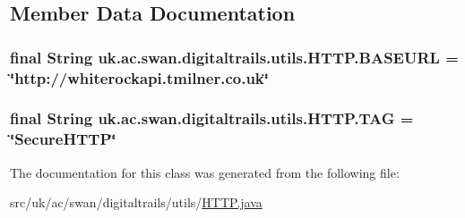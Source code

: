\subsection{Member Data Documentation}
\hypertarget{classuk_1_1ac_1_1swan_1_1digitaltrails_1_1utils_1_1_h_t_t_p_adc7390074ee303b7a69c94c5e1fb0356}{
\subsubsection[{B\+A\+S\+E\+U\+R\+L}]{\setlength{\rightskip}{0pt plus 5cm}final String uk.\+ac.\+swan.\+digitaltrails.\+utils.\+H\+T\+T\+P.\+B\+A\+S\+E\+U\+R\+L = \char`\"{}http\+://whiterockapi.\+tmilner.\+co.\+uk\char`\"{}\hspace{0.3cm}{\ttfamily [static]}}}\label{classuk_1_1ac_1_1swan_1_1digitaltrails_1_1utils_1_1_h_t_t_p_adc7390074ee303b7a69c94c5e1fb0356}
\hypertarget{classuk_1_1ac_1_1swan_1_1digitaltrails_1_1utils_1_1_h_t_t_p_af0ea53de9d06c95f912175c13ecb89ba}{
\subsubsection[{T\+A\+G}]{\setlength{\rightskip}{0pt plus 5cm}final String uk.\+ac.\+swan.\+digitaltrails.\+utils.\+H\+T\+T\+P.\+T\+A\+G = \char`\"{}Secure\+H\+T\+T\+P\char`\"{}\hspace{0.3cm}{\ttfamily [static]}}}\label{classuk_1_1ac_1_1swan_1_1digitaltrails_1_1utils_1_1_h_t_t_p_af0ea53de9d06c95f912175c13ecb89ba}


The documentation for this class was generated from the following file\+:\begin{DoxyCompactItemize}
\item 
src/uk/ac/swan/digitaltrails/utils/\hyperlink{_h_t_t_p_8java}{H\+T\+T\+P.\+java}\end{DoxyCompactItemize}
